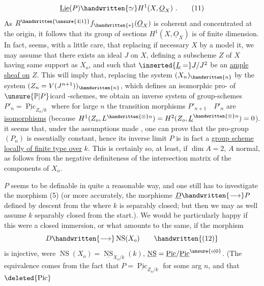 \[
\underline{\operatorname{Lie}}(P)\handwritten{\simeq}H^1(X,\underline{O}_X)\ .
\tag*{(11)}
\]
As $R^{\handwritten{\unsure{4|1}}}f_{\handwritten{*}}(\underline{O}_X)$\unsure{;} is coherent and concentrated at the origin, it follows that its group of sections $H^1(X,\underline{O}_X)$ is of finite dimension. In fact,  seems, with a little care, that  replacing if necessary $X$ by a  model  it, we may assume that there exists an  ideal $J$ on $X$,  defining a subscheme $Z$ of $X$ having same support as $X_o$, and such that $\inserted{\underline{L}=}J/J^2$ be an \uline{ample sheaf on} $Z$. This will imply that, replacing the system $(X_n)_{\handwritten{n}}$ by the system $(Z_n=V(J^{n+1}))_{\handwritten{n}}$, which defines   an isomorphic pro- of $\unsure{\mathbb{P}|P}$icard -schemes, we obtain an inverse system of group-schemes $P'_n=\underline{\operatorname{Pic}}_{Z_n/k}$ where for large $n$ the transition morphisms  $P'_{n+1}\quad P'_n$ are \uline{isomorphisms} (because $H^1(Z_o,L^{\handwritten{\otimes}n})=H^2(Z_o,\underline{L}^{\handwritten{\otimes}n})=0$).  it seems that, under the assumptions made , one can prove that the pro-group $(P_n)$ is essentially constant, hence its inverse limit $P$ is in fact a \uline{group scheme locally of finite type over} $k$. This is certainly so, at least, if $\dim A=2$, $A$ normal, as follows from the negative definiteness of the intersection matrix of the components of $X_o$.

 $P$ seems to be definable in quite a reasonable way, and one still has to investigate the morphism (5) (or more accurately, the morphisme $\underline{D}\handwritten{\longrightarrow}P$ defined by descent from the  where $k$ is separably closed; but then we may as well assume $k$ separably closed from the start\handwritten{,}.). We would be particularly happy if this were a closed immersion, or what amounts to the same, if the morphism
\[
D\handwritten{\longrightarrow}\operatorname{NS}(X_o)
\tag*{\handwritten{(12)}}
\]
is injective, were $\operatorname{NS}(X_o)=\underline{\operatorname{NS}}_{X_o/k}(k)$, $\underline{\operatorname{NS}}=\underline{\operatorname{Pic}}/\underline{\operatorname{Pic}}^{\unsure{o|0}}$. (The equivalence comes from the fact that $P=\underline{\operatorname{Pic}}_{Z_n/k}$ for some arg $n$, and that $\deleted{\operatorname{Pic}}$

